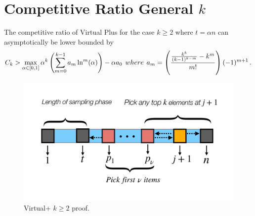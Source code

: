 \section{Competitive Ratio General $k$}
\label{app:general_k_proof}
\begin{theorem}
The competitive ratio of Virtual Plus for the case $k \geq 2$ where $t = \alpha n$ can asymptotically be lower bounded by 
\begin{equation}
    C_k >  \max_{\alpha \in [0,1]}  {\alpha}^k \left(\sum_{m = 0}^{k - 1} a_m \ln^m (\alpha)\right) - \alpha a_0
    \hspace{0.15cm }where  \hspace{0.15cm }
    a_m = \left(\frac{\frac{k^k}{(k-1)^{k-m}} - k^m}{m!}\right)(-1)^{m+1}
    \, .
\end{equation}

\end{theorem}
\begin{figure}[ht]
    \centering
    \includegraphics[width=0.50\linewidth]{Figures/general_k.pdf}
    \caption{Virtual+ $k \geq 2$ proof.}
    \label{fig:general_k}
\end{figure}
